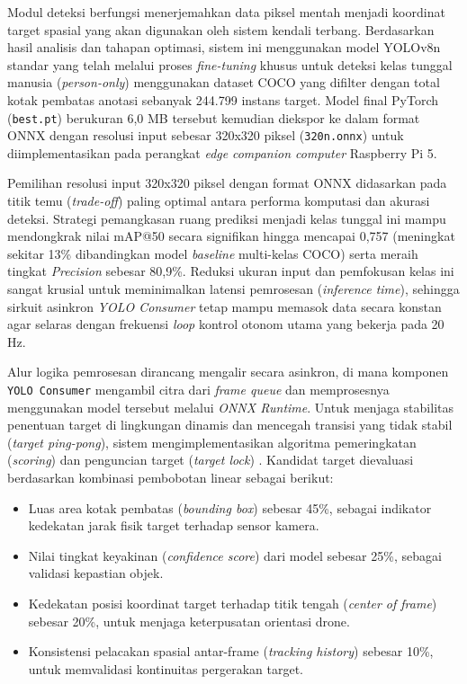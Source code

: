 Modul deteksi berfungsi menerjemahkan data piksel mentah menjadi koordinat target spasial yang akan digunakan oleh sistem kendali terbang. Berdasarkan hasil analisis dan tahapan optimasi, sistem ini menggunakan model YOLOv8n standar yang telah melalui proses \textit{fine-tuning} khusus untuk deteksi kelas tunggal manusia (\textit{person-only}) menggunakan dataset COCO yang difilter dengan total kotak pembatas anotasi sebanyak 244.799 instans target. Model final PyTorch (\texttt{best.pt}) berukuran 6,0 MB tersebut kemudian diekspor ke dalam format ONNX dengan resolusi input sebesar 320x320 piksel (\texttt{320n.onnx}) untuk diimplementasikan pada perangkat \textit{edge} \textit{companion computer} Raspberry Pi 5.

Pemilihan resolusi input 320x320 piksel dengan format ONNX didasarkan pada titik temu (\textit{trade-off}) paling optimal antara performa komputasi dan akurasi deteksi. Strategi pemangkasan ruang prediksi menjadi kelas tunggal ini mampu mendongkrak nilai mAP@50 secara signifikan hingga mencapai 0,757 (meningkat sekitar 13\% dibandingkan model \textit{baseline} multi-kelas COCO) serta meraih tingkat \textit{Precision} sebesar 80,9\%. Reduksi ukuran input dan pemfokusan kelas ini sangat krusial untuk meminimalkan latensi pemrosesan (\textit{inference time}), sehingga sirkuit asinkron \textit{YOLO Consumer} tetap mampu memasok data secara konstan agar selaras dengan frekuensi \textit{loop} kontrol otonom utama yang bekerja pada 20 Hz.

Alur logika pemrosesan dirancang mengalir secara asinkron, di mana komponen \texttt{YOLO Consumer} mengambil citra dari \textit{frame queue} dan memprosesnya menggunakan model tersebut melalui \textit{ONNX Runtime}. Untuk menjaga stabilitas penentuan target di lingkungan dinamis dan mencegah transisi yang tidak stabil (\textit{target ping-pong}), sistem mengimplementasikan algoritma pemeringkatan (\textit{scoring}) dan penguncian target (\textit{target lock}) \cite{BarShalom2001Tracking}. Kandidat target dievaluasi berdasarkan kombinasi pembobotan linear sebagai berikut:

\begin{itemize}
	\item Luas area kotak pembatas (\textit{bounding box}) sebesar 45\%, sebagai indikator kedekatan jarak fisik target terhadap sensor kamera.
	\item Nilai tingkat keyakinan (\textit{confidence score}) dari model sebesar 25\%, sebagai validasi kepastian objek.
	\item Kedekatan posisi koordinat target terhadap titik tengah (\textit{center of frame}) sebesar 20\%, untuk menjaga keterpusatan orientasi drone.
	\item Konsistensi pelacakan spasial antar-frame (\textit{tracking history}) sebesar 10\%, untuk memvalidasi kontinuitas pergerakan target.
\end{itemize}


